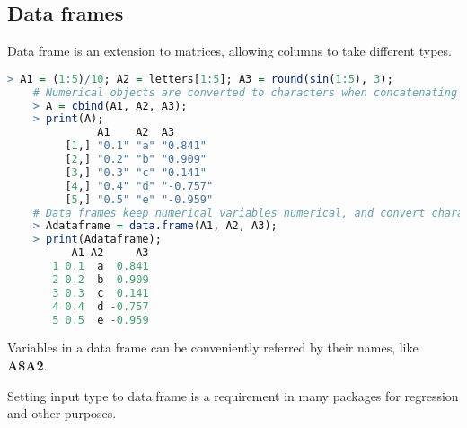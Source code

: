 \documentclass[10pt]{article}
\begin{document}
\subsection{Data frames}
Data frame is an extension to matrices, allowing columns to take different types.

\begin{lstlisting}[style=displaycode, language=R]
	> A1 = (1:5)/10; A2 = letters[1:5]; A3 = round(sin(1:5), 3);
	# Numerical objects are converted to characters when concatenating A1 to A3.
	> A = cbind(A1, A2, A3);
	> print(A);
	          A1    A2  A3      
	     [1,] "0.1" "a" "0.841" 
	     [2,] "0.2" "b" "0.909" 
	     [3,] "0.3" "c" "0.141" 
	     [4,] "0.4" "d" "-0.757"
	     [5,] "0.5" "e" "-0.959"
	# Data frames keep numerical variables numerical, and convert characters to factors.
	> Adataframe = data.frame(A1, A2, A3);
	> print(Adataframe);
	      A1 A2     A3
	   1 0.1  a  0.841
	   2 0.2  b  0.909
	   3 0.3  c  0.141
	   4 0.4  d -0.757
	   5 0.5  e -0.959
\end{lstlisting}

Variables in a data frame can be conveniently referred by their names, like {\bf A\$A2}.

Setting input type to data.frame is a requirement in many packages for regression and other purposes.
\end{document}
